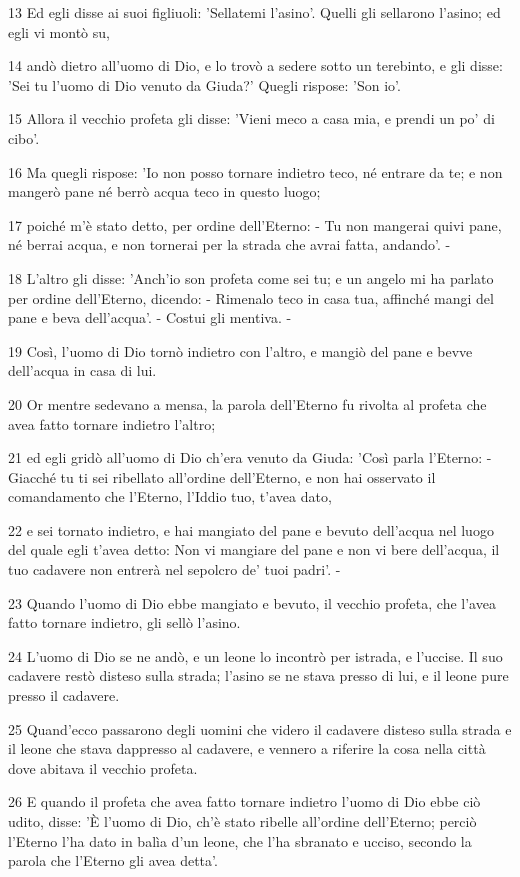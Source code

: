 \par 13 Ed egli disse ai suoi figliuoli: 'Sellatemi l'asino'. Quelli gli sellarono l'asino; ed egli vi montò su,
\par 14 andò dietro all'uomo di Dio, e lo trovò a sedere sotto un terebinto, e gli disse: 'Sei tu l'uomo di Dio venuto da Giuda?' Quegli rispose: 'Son io'.
\par 15 Allora il vecchio profeta gli disse: 'Vieni meco a casa mia, e prendi un po' di cibo'.
\par 16 Ma quegli rispose: 'Io non posso tornare indietro teco, né entrare da te; e non mangerò pane né berrò acqua teco in questo luogo;
\par 17 poiché m'è stato detto, per ordine dell'Eterno: - Tu non mangerai quivi pane, né berrai acqua, e non tornerai per la strada che avrai fatta, andando'. -
\par 18 L'altro gli disse: 'Anch'io son profeta come sei tu; e un angelo mi ha parlato per ordine dell'Eterno, dicendo: - Rimenalo teco in casa tua, affinché mangi del pane e beva dell'acqua'. - Costui gli mentiva. -
\par 19 Così, l'uomo di Dio tornò indietro con l'altro, e mangiò del pane e bevve dell'acqua in casa di lui.
\par 20 Or mentre sedevano a mensa, la parola dell'Eterno fu rivolta al profeta che avea fatto tornare indietro l'altro;
\par 21 ed egli gridò all'uomo di Dio ch'era venuto da Giuda: 'Così parla l'Eterno: - Giacché tu ti sei ribellato all'ordine dell'Eterno, e non hai osservato il comandamento che l'Eterno, l'Iddio tuo, t'avea dato,
\par 22 e sei tornato indietro, e hai mangiato del pane e bevuto dell'acqua nel luogo del quale egli t'avea detto: Non vi mangiare del pane e non vi bere dell'acqua, il tuo cadavere non entrerà nel sepolcro de' tuoi padri'. -
\par 23 Quando l'uomo di Dio ebbe mangiato e bevuto, il vecchio profeta, che l'avea fatto tornare indietro, gli sellò l'asino.
\par 24 L'uomo di Dio se ne andò, e un leone lo incontrò per istrada, e l'uccise. Il suo cadavere restò disteso sulla strada; l'asino se ne stava presso di lui, e il leone pure presso il cadavere.
\par 25 Quand'ecco passarono degli uomini che videro il cadavere disteso sulla strada e il leone che stava dappresso al cadavere, e vennero a riferire la cosa nella città dove abitava il vecchio profeta.
\par 26 E quando il profeta che avea fatto tornare indietro l'uomo di Dio ebbe ciò udito, disse: 'È l'uomo di Dio, ch'è stato ribelle all'ordine dell'Eterno; perciò l'Eterno l'ha dato in balìa d'un leone, che l'ha sbranato e ucciso, secondo la parola che l'Eterno gli avea detta'.

